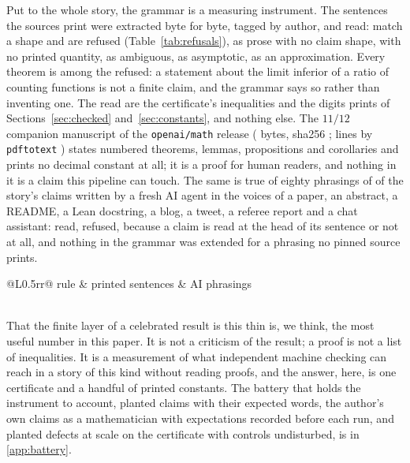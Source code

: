 \documentclass[preprint,11pt,authoryear,a4paper]{elsarticle}
\begin{document}
Put to the whole story, the grammar is a measuring instrument. The \RfSentences{} sentences the sources print were extracted byte for byte, tagged by author, and read: \RfShaped{} match a shape and \RfRefused{} are refused (Table~\ref{tab:refusals}), \RfRefProse{} as prose with no claim shape, \RfRefNoQuantity{} with no printed quantity, \RfRefAmbiguous{} as ambiguous, \RfRefAsymptotic{} as asymptotic, \RfRefApproximate{} as an approximation. Every theorem is among the refused: a statement about the limit inferior of a ratio of counting functions is not a finite claim, and the grammar says so rather than inventing one. The \RfShaped{} read are the certificate's inequalities and the digits prints of Sections~\ref{sec:checked} and~\ref{sec:constants}, and nothing else. The $11/12$ companion manuscript of the \texttt{openai/math} release \citep{OpenAIMath} (\RfManuscriptBytes{} bytes, sha256 \texttt{\RfManuscriptSha}; \RfManuscriptLines{} lines by \texttt{pdftotext} \RfPdftotext) states \RfManuscriptStatements{} numbered theorems, lemmas, propositions and corollaries and prints no decimal constant at all; it is a proof for human readers, and nothing in it is a claim this pipeline can touch. The same is true of eighty phrasings of \RfPhrasingsClaims{} of the story's claims written by a fresh AI agent in the voices of a paper, an abstract, a README, a Lean docstring, a blog, a tweet, a referee report and a chat assistant: \RfPhrasingsShaped{} read, \RfPhrasingsRefused{} refused, because a claim is read at the head of its sentence or not at all, and nothing in the grammar was extended for a phrasing no pinned source prints.

\begin{table}[htbp]\centering\footnotesize
\begin{tabular}{@{}L{0.5\linewidth}rr@{}}\toprule
rule & printed sentences & AI phrasings \\\midrule
\RfRefusalRows \\
\bottomrule\end{tabular}
\caption{The refusals by rule, over the \RfRefused{} refused printed sentences and the \RfPhrasingsRefused{} refused AI phrasings. The \RfShaped{} sentences read are listed in Table~\ref{tab:shaped}.}\label{tab:refusals}
\end{table}

That the finite layer of a celebrated result is this thin is, we think, the most useful number in this paper. It is not a criticism of the result; a proof is not a list of inequalities. It is a measurement of what independent machine checking can reach in a story of this kind without reading proofs, and the answer, here, is one certificate and a handful of printed constants. The battery that holds the instrument to account, planted claims with their expected words, the author's own claims as a mathematician with expectations recorded before each run, and \RfPlants{} planted defects at scale on the certificate with \RfControls{} controls undisturbed, is in \ref{app:battery}.
\end{document}
